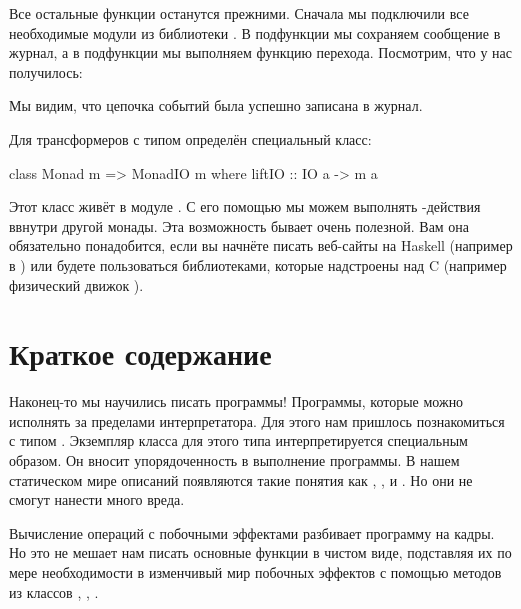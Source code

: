 Все остальные функции останутся прежними. 
Сначала мы подключили все необходимые модули из
библиотеки . 
В подфункции  мы сохраняем сообщение в журнал,
а в подфункции  мы выполняем функцию перехода.
Посмотрим, что у нас получилось:


Мы видим, что цепочка событий была успешно записана
в журнал. 

Для трансформеров с типом  определён специальный класс:

\begin{code}
class Monad m => MonadIO m where
    liftIO :: IO a -> m a
\end{code}

Этот класс живёт в модуле . 
С его помощью мы можем выполнять -действия 
ввнутри другой монады. Эта возможность бывает 
очень полезной. Вам она обязательно понадобится, если вы 
начнёте писать веб-сайты на Haskell (например в )
или будете пользоваться библиотеками, которые
надстроены над C (например физический движок ). 


\section{Краткое содержание}

Наконец-то мы научились писать программы! Программы, которые
можно исполнять за пределами интерпретатора. Для этого нам
пришлось познакомиться с типом . Экземпляр класса
 для этого типа интерпретируется специальным образом. 
Он вносит упорядоченность в выполнение программы. В нашем статическом
мире описаний появляются такие понятия как ,
,  и . Но они не смогут
нанести много вреда. 

Вычисление операций с побочными эффектами разбивает
программу на кадры. Но это не мешает нам писать основные
функции в чистом виде, подставляя их по мере необходимости
в изменчивый мир побочных эффектов 
с помощью методов из классов , ,
.

